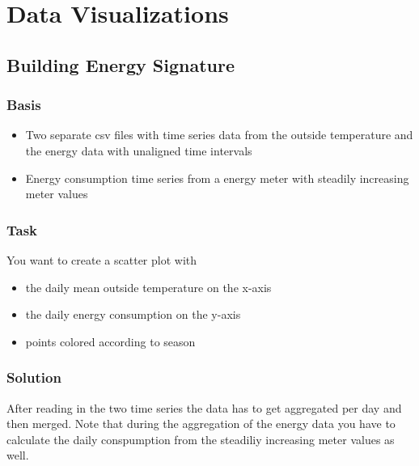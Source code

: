 \documentclass[
]{book}
\begin{document}
\hypertarget{data-visualizations}{%
\chapter{Data Visualizations}\label{data-visualizations}}

\hypertarget{building-energy-signature}{%
\section{Building Energy Signature}\label{building-energy-signature}}

\hypertarget{basis}{%
\subsection{Basis}\label{basis}}

\begin{itemize}
\item
  Two separate csv files with time series data from the outside temperature and the energy data with unaligned time intervals
\item
  Energy consumption time series from a energy meter with steadily increasing meter values
\end{itemize}

\hypertarget{task}{%
\subsection{Task}\label{task}}

You want to create a scatter plot with

\begin{itemize}
\item
  the daily mean outside temperature on the x-axis
\item
  the daily energy consumption on the y-axis
\item
  points colored according to season
\end{itemize}

\hypertarget{solution}{%
\subsection{Solution}\label{solution}}

After reading in the two time series the data has to get aggregated per day and then merged. Note that during the aggregation of the energy data you have to calculate the daily conspumption from the steadiliy increasing meter values as well.
\end{document}
